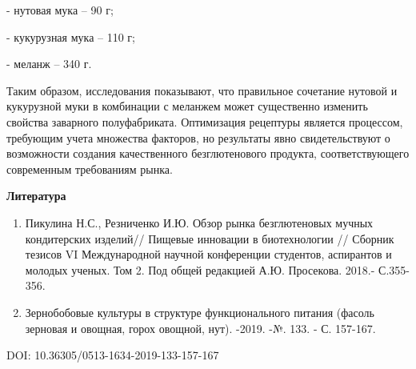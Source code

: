 - нутовая мука -- 90 г;

- кукурузная мука -- 110 г;

- меланж -- 340 г.

Таким образом, исследования показывают, что правильное сочетание нутовой
и кукурузной муки в комбинации с меланжем может существенно изменить
свойства заварного полуфабриката. Оптимизация рецептуры является
процессом, требующим учета множества факторов, но результаты явно
свидетельствуют о возможности создания качественного безглютенового
продукта, соответствующего современным требованиям рынка.

{\bfseries Литература}

\begin{enumerate}
\def\labelenumi{\arabic{enumi}.}
\item
  Пикулина Н.С., Резниченко И.Ю. Обзор рынка безглютеновых мучных
  кондитерских изделий// Пищевые инновации в биотехнологии // Сборник
  тезисов VI Международной научной конференции студентов, аспирантов и
  молодых ученых. Том 2. Под общей редакцией А.Ю. Просекова. 2018.-
  С.355-356.
\item
  Зернобобовые культуры в структуре функционального питания (фасоль
  зерновая и овощная, горох овощной, нут). -2019. -№. 133. - С. 157-167.
\end{enumerate}

DOI: 10.36305/0513-1634-2019-133-157-167

